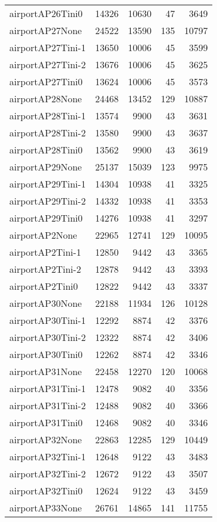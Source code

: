 \begin{longtable}{lrrrr}
airportAP26Tini0 & 14326 & 10630 & 47 & 3649 \\
airportAP27None & 24522 & 13590 & 135 & 10797 \\
airportAP27Tini-1 & 13650 & 10006 & 45 & 3599 \\
airportAP27Tini-2 & 13676 & 10006 & 45 & 3625 \\
airportAP27Tini0 & 13624 & 10006 & 45 & 3573 \\
airportAP28None & 24468 & 13452 & 129 & 10887 \\
airportAP28Tini-1 & 13574 & 9900 & 43 & 3631 \\
airportAP28Tini-2 & 13580 & 9900 & 43 & 3637 \\
airportAP28Tini0 & 13562 & 9900 & 43 & 3619 \\
airportAP29None & 25137 & 15039 & 123 & 9975 \\
airportAP29Tini-1 & 14304 & 10938 & 41 & 3325 \\
airportAP29Tini-2 & 14332 & 10938 & 41 & 3353 \\
airportAP29Tini0 & 14276 & 10938 & 41 & 3297 \\
airportAP2None & 22965 & 12741 & 129 & 10095 \\
airportAP2Tini-1 & 12850 & 9442 & 43 & 3365 \\
airportAP2Tini-2 & 12878 & 9442 & 43 & 3393 \\
airportAP2Tini0 & 12822 & 9442 & 43 & 3337 \\
airportAP30None & 22188 & 11934 & 126 & 10128 \\
airportAP30Tini-1 & 12292 & 8874 & 42 & 3376 \\
airportAP30Tini-2 & 12322 & 8874 & 42 & 3406 \\
airportAP30Tini0 & 12262 & 8874 & 42 & 3346 \\
airportAP31None & 22458 & 12270 & 120 & 10068 \\
airportAP31Tini-1 & 12478 & 9082 & 40 & 3356 \\
airportAP31Tini-2 & 12488 & 9082 & 40 & 3366 \\
airportAP31Tini0 & 12468 & 9082 & 40 & 3346 \\
airportAP32None & 22863 & 12285 & 129 & 10449 \\
airportAP32Tini-1 & 12648 & 9122 & 43 & 3483 \\
airportAP32Tini-2 & 12672 & 9122 & 43 & 3507 \\
airportAP32Tini0 & 12624 & 9122 & 43 & 3459 \\
airportAP33None & 26761 & 14865 & 141 & 11755 \\

\end{longtable}
